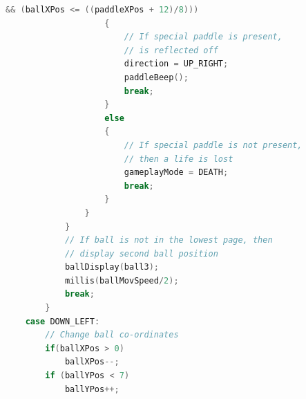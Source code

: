 \documentclass{article}
\begin{document}
\begin{lstlisting}[basicstyle = \small, language = C]
                    && (ballXPos <= ((paddleXPos + 12)/8)))
                    {
                        // If special paddle is present, 
                        // is reflected off
                        direction = UP_RIGHT;
                        paddleBeep();
                        break;
                    }
                    else
                    {
                        // If special paddle is not present, 
                        // then a life is lost
                        gameplayMode = DEATH;
                        break;
                    }
                }
            }
            // If ball is not in the lowest page, then 
            // display second ball position
            ballDisplay(ball3);
            millis(ballMovSpeed/2);
            break;
        }
    case DOWN_LEFT:
        // Change ball co-ordinates
        if(ballXPos > 0)
            ballXPos--;
        if (ballYPos < 7)
            ballYPos++;


\end{lstlisting}
\end{document}

